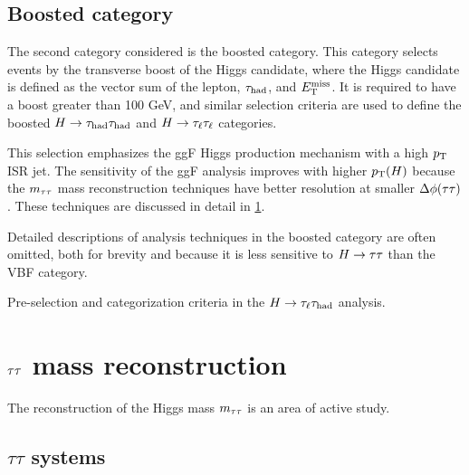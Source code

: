 \subsection{Boosted category}
\label{sec:strategy-boost}

The second category considered is the boosted category. This category selects events by the transverse boost of the Higgs candidate, where the Higgs candidate is defined as the vector sum of the lepton, $\tau_\text{had}$, and $E_{\mathrm{T}}^{\mathrm{miss}}$. It is required to have a boost greater than 100 GeV, and similar selection criteria are used to define the boosted $H\rightarrow\tau_\text{had}\tau_\text{had}$ and $H\rightarrow\tau_\ell\tau_\ell$ categories.

This selection emphasizes the ggF Higgs production mechanism with a high $p_{\mathrm{T}}$ ISR jet. The sensitivity of the ggF analysis improves with higher $p_{\mathrm{T}}(H)$ because the $m_{\tau\tau}$ mass reconstruction techniques have better resolution at smaller $\Delta\phi(\tau\tau)$. These techniques are discussed in detail in \cref{sec:strategy-mtautau}.

Detailed descriptions of analysis techniques in the boosted category are often omitted, both for brevity and because it is less sensitive to $H\rightarrow\tau\tau$ than the VBF category.

\begin{table}[bp]
  \centering
  \renewcommand{\arraystretch}{1.4}
  \caption{Pre-selection and categorization criteria in the $H\rightarrow\tau_\ell\tau_\text{had}$ analysis.}
  
  \label{tab:strategy-selection}
\end{table}

\clearpage

\section{$\tau\tau$ mass reconstruction}
\label{sec:strategy-mtautau}

The reconstruction of the Higgs mass $m_{\tau\tau}$ is an area of active study.

\subsection{$\tau\tau$ systems}
\label{sec:strategy-mtautau-intro}

